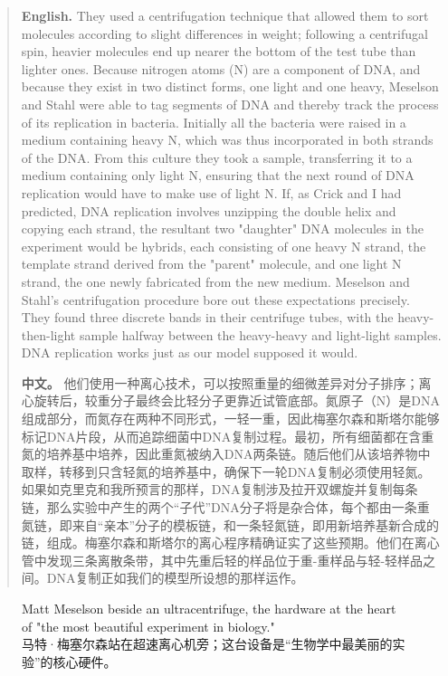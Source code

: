 \begin{quote}
\noindent\textbf{English.} They used a centrifugation technique that allowed them to sort molecules according to slight differences in weight; following a centrifugal spin, heavier molecules end up nearer the bottom of the test tube than lighter ones. Because nitrogen atoms (N) are a component of DNA, and because they exist in two distinct forms, one light and one heavy, Meselson and Stahl were able to tag segments of DNA and thereby track the process of its replication in bacteria. Initially all the bacteria were raised in a medium containing heavy N, which was thus incorporated in both strands of the DNA. From this culture they took a sample, transferring it to a medium containing only light N, ensuring that the next round of DNA replication would have to make use of light N. If, as Crick and I had predicted, DNA replication involves unzipping the double helix and copying each strand, the resultant two "daughter" DNA molecules in the experiment would be hybrids, each consisting of one heavy N strand, the template strand derived from the "parent" molecule, and one light N strand, the one newly fabricated from the new medium. Meselson and Stahl's centrifugation procedure bore out these expectations precisely. They found three discrete bands in their centrifuge tubes, with the heavy-then-light sample halfway between the heavy-heavy and light-light samples. DNA replication works just as our model supposed it would.

\smallskip
\noindent\textbf{中文。} 他们使用一种离心技术，可以按照重量的细微差异对分子排序；离心旋转后，较重分子最终会比轻分子更靠近试管底部。氮原子（N）是DNA组成部分，而氮存在两种不同形式，一轻一重，因此梅塞尔森和斯塔尔能够标记DNA片段，从而追踪细菌中DNA复制过程。最初，所有细菌都在含重氮的培养基中培养，因此重氮被纳入DNA两条链。随后他们从该培养物中取样，转移到只含轻氮的培养基中，确保下一轮DNA复制必须使用轻氮。如果如克里克和我所预言的那样，DNA复制涉及拉开双螺旋并复制每条链，那么实验中产生的两个“子代”DNA分子将是杂合体，每个都由一条重氮链，即来自“亲本”分子的模板链，和一条轻氮链，即用新培养基新合成的链，组成。梅塞尔森和斯塔尔的离心程序精确证实了这些预期。他们在离心管中发现三条离散条带，其中先重后轻的样品位于重-重样品与轻-轻样品之间。DNA复制正如我们的模型所设想的那样运作。
\end{quote}

\begin{figure}[htbp]
\centering
{}
\caption{Matt Meselson beside an ultracentrifuge, the hardware at the heart of "the most beautiful experiment in biology."\\马特·梅塞尔森站在超速离心机旁；这台设备是“生物学中最美丽的实验”的核心硬件。}
\end{figure}

